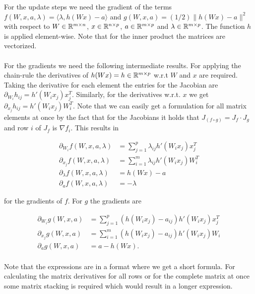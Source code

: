 \documentclass[english,11pt,a4paper]{article}
\newcommand\inner[2]{\langle #1, #2 \rangle}
\begin{document}
For the update steps we need the gradient of the terms $f(W,x,a,\lambda) = \inner{\lambda}{h(Wx)-a}$ and $g(W,x,a) = (1/2) \| h(Wx) - a \|^2$ with respect to $W \in \mathbb{R}^{m \times n}$, $x \in \mathbb{R}^{n \times p}$, $a \in \mathbb{R}^{m \times p}$ and $\lambda \in \mathbb{R}^{m \times p}$. The function $h$ is applied element-wise. Note that for the inner product the matrices are vectorized. \\ \\
For the gradients we need the following intermediate results. For applying the chain-rule the derivatives of $h(Wx) = h \in \mathbb{R}^{m \times p}$ w.r.t $W$ and $x$ are required. Taking the derivative for each element the entries for the Jacobian are $\partial_{W_i}h_{ij} = h'(W_i x_j) x_j^T$. Similarly, for the derivatives w.r.t. $x$ we get $\partial_{x_j}h_{ij} = h'(W_i x_j) W_i^T $. Note that we can easily get a formulation for all matrix elements at once by the fact that for the Jacobians it holds that $J_{(f \circ g)} = J_f \cdot J_g$ and row $i$ of $J_f$ is $\nabla f_i$. This results in

\begin{equation}
	\begin{aligned}
		\partial_{W_i} f(W,x,a,\lambda) &= \sum_{j=1}^{p} \lambda_{ij} h'(W_i x_j) x_j^T \\
		\partial_{x_j} f(W,x,a,\lambda) &= \sum_{i=1}^{m} \lambda_{ij} h'(W_i x_j) W_i^T \\
		\partial_{\lambda} f(W,x,a,\lambda) &= h(W x) - a \\
		\partial_{a} f(W,x,a,\lambda) &= -\lambda
	\end{aligned}
\end{equation}

for the gradients of $f$. For $g$ the gradients are

\begin{equation}
	\begin{aligned}
		\partial_{W_i} g(W,x,a) &= \sum_{j=1}^{p} (h(W_i x_j) - a_{ij}) h'(W_i x_j) x_j^T \\
		\partial_{x_j} g(W,x,a) &= \sum_{i=1}^{m} (h(W_i x_j) - a_{ij}) h'(W_i x_j) W_i \\		
		\partial_{a} g(W,x,a) &= a - h(Wx). \\
	\end{aligned}
\end{equation}

Note that the expressions are in a format where we get a short formula. For calculating the matrix derivatives for all rows or for the complete matrix at once some matrix stacking is required which would result in a longer expression.
\end{document}
